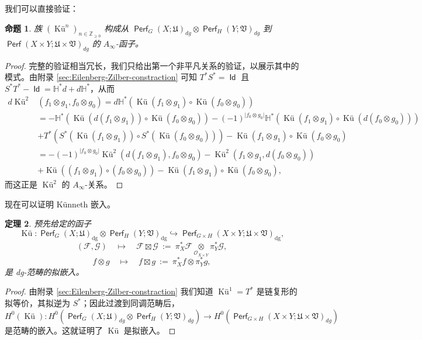 \documentclass[11pt,a4paper]{article}
\DeclareMathOperator{\id}{\mathsf{Id}}
\DeclareMathOperator{\Perf}{\mathsf{Perf}}
\DeclareMathOperator{\dg}{\operatorname{dg}}
\DeclareMathOperator{\Ku}{\textrm{Kü}}
\theoremstyle{cnth}
\newtheorem{thm}{定理}[section]
\newtheorem{prp}[thm]{命题}
\begin{document}
我们可以直接验证：
\begin{prp}
族 $(\Ku^n)_{n\in\mathbb{Z}_{\geq0}}$ 构成从 $\Perf_G (X;\mathfrak{U})_{dg}\otimes\Perf_H (Y;\mathfrak{V})_{dg}$ 到 $\Perf (X\times Y;\mathfrak{U}\times\mathfrak{V})_{dg}$ 的 $A_{\infty}$-函子。
\end{prp}
\begin{proof}
完整的验证相当冗长，我们只给出第一个非平凡关系的验证，以展示其中的模式。由附录 \ref{sec:Eilenberg-Zilber-constraction} 可知 $T^{\ast} S^{\ast} =\id$ 且 $S^{\ast} T^{\ast} -\id =\mathbb{H}^{\ast}d+d\mathbb{H}^{\ast}$，从而
\begin{align*}
d\Ku^2& (f_1\otimes g_1,f_0\otimes g_0)=d\mathbb{H}^{\ast} (\Ku (f_1\otimes g_1)\circ\Ku (f_0\otimes g_0))\\ 
&=-\mathbb{H}^{\ast} (\Ku (d(f_1\otimes g_1))\circ \Ku (f_0\otimes g_0)) -(-1)^{\vert f_0\otimes g_0\vert }\mathbb{H}^{\ast} (\Ku(f_1\otimes g_1)\circ\Ku (d(f_0\otimes g_0)))\\
&+T^{\ast} (S^{\ast}(\Ku (f_1\otimes g_1))\circ S^{\ast} (\Ku (f_0\otimes g_0))) -\Ku (f_1\otimes g_1)\circ\Ku (f_0\otimes g_0)\\ 
&=-(-1)^{\vert f_0\otimes g_0\vert }\Ku^2 (d(f_1\otimes g_1),f_0\otimes g_0) - \Ku^2(f_1\otimes g_1,d(f_0\otimes g_0))\\ 
&+\Ku((f_1\otimes g_1)\circ (f_0\otimes g_0))-\Ku (f_1\otimes g_1)\circ\Ku (f_0\otimes g_0),
\end{align*}
而这正是 $\Ku^2$ 的 $A_{\infty}$-关系。
\end{proof}

现在可以证明 Künneth 嵌入。
\begin{thm}\label{thm:Kunneth-embedding}
预先给定的函子
$$
\Ku\colon\Perf_G(X;\mathfrak{U})_{\dg}
\otimes
\Perf_H(Y;\mathfrak{V})_{\dg}
\hookrightarrow
\Perf_{G\times H}(X\times Y;\mathfrak{U}\times\mathfrak{V})_{\dg},
$$
$$
(\mathcal{F},\mathcal{G})
\quad\mapsto\quad
\mathcal{F}\boxtimes\mathcal{G}
~:=~
\pi_X^*\mathcal{F}
\underset{\mathcal{O}_{X\times Y}}{\otimes}
\pi_Y^*\mathcal{G},
$$
$$
f\otimes g
\quad\mapsto\quad
f\boxtimes g
~:=~
\pi_X^*f
\otimes
\pi_Y^*g,
$$
是 dg-范畴的拟嵌入。
\end{thm}
\begin{proof}
由附录 \ref{sec:Eilenberg-Zilber-constraction} 我们知道 $\Ku^1 =T^{\ast}$ 是链复形的拟等价，其拟逆为 $S^{\ast}$；因此过渡到同调范畴后，$H^0 (\Ku)\colon H^0 (\Perf_G (X;\mathfrak{U})_{dg}\otimes\Perf_H (Y;\mathfrak{V})_{dg})\to H^0 (\Perf_{G\times H} (X\times Y;\mathfrak{U}\times\mathfrak{V})_{dg})$ 是范畴的嵌入。这就证明了 $\Ku$ 是拟嵌入。
\end{proof}
\end{document}
